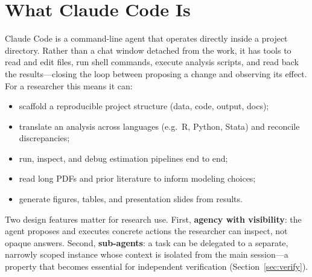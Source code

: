 \documentclass[11pt]{article}
\begin{document}
\section{What Claude Code Is}
Claude Code is a command-line agent that operates directly inside a project
directory. Rather than a chat window detached from the work, it has tools to
read and edit files, run shell commands, execute analysis scripts, and read
back the results---closing the loop between proposing a change and observing
its effect. For a researcher this means it can:
\begin{itemize}
  \item scaffold a reproducible project structure (data, code, output, docs);
  \item translate an analysis across languages (e.g.\ \textsf{R},
        \textsf{Python}, \textsf{Stata}) and reconcile discrepancies;
  \item run, inspect, and debug estimation pipelines end to end;
  \item read long PDFs and prior literature to inform modeling choices;
  \item generate figures, tables, and presentation slides from results.
\end{itemize}

\noindent Two design features matter for research use. First, \textbf{agency
with visibility}: the agent proposes and executes concrete actions the
researcher can inspect, not opaque answers. Second, \textbf{sub-agents}: a task
can be delegated to a separate, narrowly scoped instance whose context is
isolated from the main session---a property that becomes essential for
independent verification (Section~\ref{sec:verify}).

\end{document}
